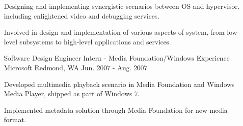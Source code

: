 \begin{cventries}
{\begin{cvitems}
        \item {Designing and implementing synergistic scenarios between OS and hypervisor, including enlightened video and debugging services.}
        \item {Involved in design and implementation of various aspects of system, from low-level subsystems to high-level applications and services.}
      \end{cvitems} 
    }
  \cventry
    {Software Design Engineer Intern - Media Foundation/Windows Experience}
    {Microsoft}
    {Redmond, WA}
    {Jun. 2007 - Aug. 2007}
    {
      \begin{cvitems}
        \item {Developed multimedia playback scenario in Media Foundation and Windows Media Player, shipped as part of Windows 7.}
        \item {Implemented metadata solution through Media Foundation for new media format. }
      \end{cvitems}
    }
\end{cventries}
